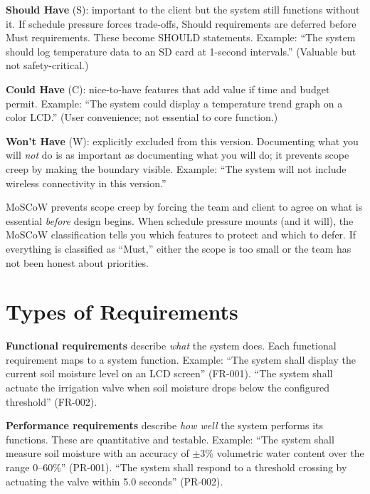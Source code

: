 \textbf{Should Have} (S): important to the client but the system still functions without it. If schedule pressure forces trade-offs, Should requirements are deferred before Must requirements. These become SHOULD statements. Example: ``The system should log temperature data to an SD card at 1-second intervals.'' (Valuable but not safety-critical.)

\textbf{Could Have} (C): nice-to-have features that add value if time and budget permit. Example: ``The system could display a temperature trend graph on a color LCD.'' (User convenience; not essential to core function.)

\textbf{Won't Have} (W): explicitly excluded from this version. Documenting what you will \emph{not} do is as important as documenting what you will do; it prevents scope creep by making the boundary visible. Example: ``The system will not include wireless connectivity in this version.''

MoSCoW prevents scope creep by forcing the team and client to agree on what is essential \emph{before} design begins. When schedule pressure mounts (and it will), the MoSCoW classification tells you which features to protect and which to defer. If everything is classified as ``Must,'' either the scope is too small or the team has not been honest about priorities.

\section{Types of Requirements}

\textbf{Functional requirements} describe \emph{what} the system does. Each functional requirement maps to a system function. Example: ``The system shall display the current soil moisture level on an LCD screen'' (FR-001). ``The system shall actuate the irrigation valve when soil moisture drops below the configured threshold'' (FR-002).

\textbf{Performance requirements} describe \emph{how well} the system performs its functions. These are quantitative and testable. Example: ``The system shall measure soil moisture with an accuracy of $\pm$3\% volumetric water content over the range 0--60\%'' (PR-001). ``The system shall respond to a threshold crossing by actuating the valve within 5.0 seconds'' (PR-002).

